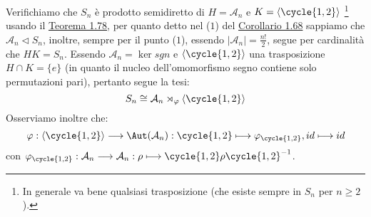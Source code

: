 \documentclass[11pt]{scrartcl}
\begin{document}
\begin{example}
    Verifichiamo che $S_n$ è prodotto semidiretto di $H = \mathcal{A}_n$ e $ K = \left<\cycle{1,2}\right>$ \footnote{In generale va bene qualsiasi trasposizione (che esiste sempre in $S_n$ per $n \geq 2$).}
    usando il \hyperref[t:1.78]{Teorema 1.78}, per quanto detto nel ($1$) del \hyperref[c:1.68]{Corollario 1.68} sappiamo che $\mathcal{A}_n \triangleleft S_n$, inoltre, sempre per il punto ($1$), essendo $|\mathcal{A}_n| = \frac{n!}{2}$, segue
    per cardinalità che $HK = S_n$. Essendo $\mathcal{A}_n = \ker sgn$ e $\left<\cycle{1,2}\right>$ una trasposizione $H \cap K = \{e\}$ (in quanto il nucleo dell'omomorfismo segno contiene solo permutazioni pari), pertanto segue la tesi:
        \[ S_n \cong \mathcal{A}_n \rtimes_{\varphi} \left<\cycle{1,2}\right>
            \]
    Osserviamo inoltre che:
        \[ \varphi : \left<\cycle{1,2}\right> \longrightarrow \Aut(\mathcal{A}_n) : \cycle{1,2} \longmapsto \varphi_{\cycle{1,2}}, id \longmapsto id
            \]
    con $\varphi_{\cycle{1,2}} : \mathcal{A}_n \longrightarrow \mathcal{A}_n : \rho \longmapsto \cycle{1,2}\rho\cycle{1,2}^{-1}$.
\end{example}
\end{document}
